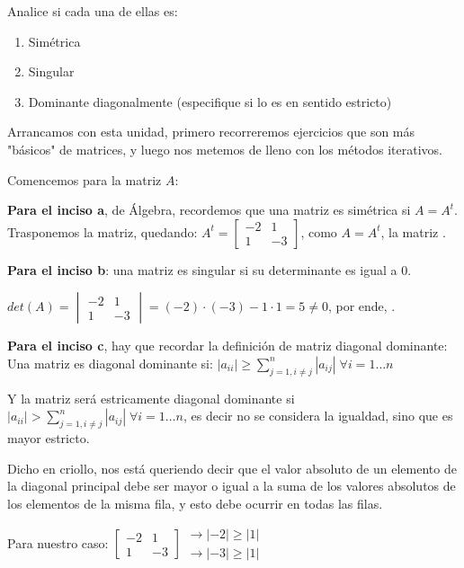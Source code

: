 \documentclass[11pt]{article}
\begin{document}
	Analice si cada una de ellas es:
	\begin{enumerate}[label=\alph*)]
		\item Simétrica
		\item Singular
		\item Dominante diagonalmente (especifique si lo es en sentido estricto)
	\end{enumerate}

	Arrancamos con esta unidad, primero recorreremos ejercicios que son más "básicos" de matrices, y luego nos metemos de lleno con los métodos iterativos.
	
	Comencemos para la matriz $A$:
	
	\textbf{Para el inciso a}, de Álgebra, recordemos que una matriz es simétrica si $A=A^t$.\\
	Trasponemos la matriz, quedando: $A^t=\begin{bmatrix}
		-2 & 1 \\
		1 & -3
	\end{bmatrix}$, como $A=A^t$, la matriz .

	\textbf{Para el inciso b}: una matriz es singular si su determinante es igual a 0.
	
	$det(A)=\begin{vmatrix}
		-2 & 1 \\
		1 & -3
	\end{vmatrix}=(-2)\cdot(-3)-1\cdot1=5\ne0$, por ende, .

	\textbf{Para el inciso c}, hay que recordar la definición de matriz diagonal dominante:\\
	Una matriz es diagonal dominante si: $\displaystyle |a_{ii}|\ge \sum_{j=1, i\ne j}^{n} |a_{ij}| \; \forall i=1\dots n$
	
	Y la matriz será estricamente diagonal dominante si $\displaystyle |a_{ii}| > \sum_{j=1, i\ne j}^{n} |a_{ij}| \; \forall i=1\dots n$, es decir no se considera la igualdad, sino que es mayor estricto.
	
	Dicho en criollo, nos está queriendo decir que el valor absoluto de un elemento de la diagonal principal debe ser mayor o igual a la suma de los valores absolutos de los elementos de la misma fila, y esto debe ocurrir en todas las filas.
	
	Para nuestro caso: $\begin{bmatrix}
		-2 & 1 \\
		1 & -3
	\end{bmatrix}$$\begin{matrix}
	\rightarrow |-2| \ge |1| \\
	\rightarrow |-3| \ge |1|
\end{matrix}$
\end{document}
